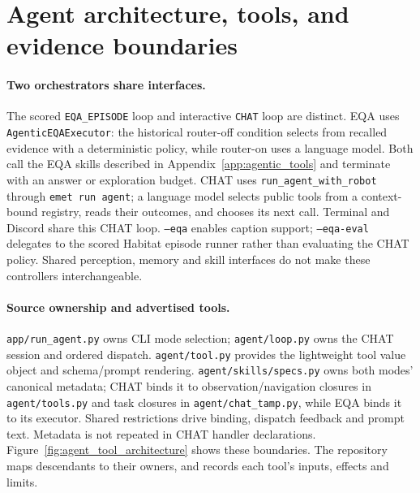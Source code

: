 \section{Agent architecture, tools, and evidence boundaries}
\label{app:combined_agent}

\paragraph{Two orchestrators share interfaces.}
The scored \texttt{EQA\_EPISODE} loop and interactive \texttt{CHAT} loop are distinct.
EQA uses \texttt{AgenticEQAExecutor}: the historical router-off condition selects
from recalled evidence with a deterministic policy, while router-on uses a
language model. Both call the EQA skills described in
Appendix~\ref{app:agentic_tools} and terminate with an answer or exploration budget.
CHAT uses \texttt{run\_agent\_with\_robot} through \texttt{emet run agent}; a language
model selects public tools from a context-bound registry, reads their outcomes,
and chooses its next call. Terminal and Discord share this CHAT loop.
\texttt{--eqa} enables caption support; \texttt{--eqa-eval} delegates to the scored
Habitat episode runner rather than evaluating the CHAT policy. Shared perception,
memory and skill interfaces do not make these controllers interchangeable.

\paragraph{Source ownership and advertised tools.}
\texttt{app/run\_agent.py} owns CLI mode selection;
\texttt{agent/loop.py} owns the CHAT session and ordered dispatch.
\texttt{agent/tool.py} provides the lightweight tool value object and schema/prompt
rendering. \texttt{agent/skills/specs.py} owns both modes' canonical metadata;
CHAT binds it to observation/navigation closures in \texttt{agent/tools.py}
and task closures in \texttt{agent/chat\_tamp.py}, while EQA binds it to its
executor. Shared restrictions drive binding, dispatch feedback and prompt text. Metadata is not repeated in CHAT handler declarations.
Figure~\ref{fig:agent_tool_architecture} shows these boundaries. The repository
 maps descendants to their owners, and
 records each tool's inputs, effects and limits.

